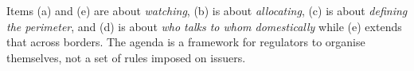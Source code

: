 \begin{cikeybox}[title={Where the five items point}]
Items (a) and (e) are about \emph{watching}, (b) is about \emph{allocating}, (c) is about
\emph{defining the perimeter}, and (d) is about \emph{who talks to whom domestically} while
(e) extends that across borders. The agenda is a framework for regulators to organise
themselves, not a set of rules imposed on issuers.
\end{cikeybox}
